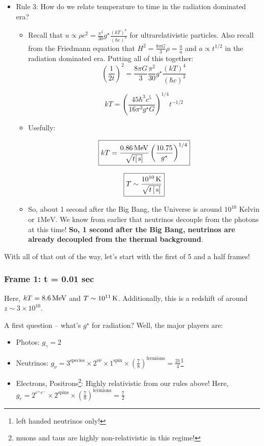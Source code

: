 \documentclass{article}
\newcommand{\unit}[1]{{\,\rm #1}}
\newcommand{\be}{\begin{equation}}
\newcommand{\ee}{\end{equation}}
\begin{document}
\begin{itemize}
    \item Rule 3: How do we relate temperature to time in the radiation dominated era?
    \begin{itemize}
        \item Recall that $u \propto \rho c^2 = \frac{\pi^2}{30}g^\star \frac{(kT)^4}{(\hbar c)^3}$ for ultrarelativistic particles. Also recall from the Friedmann equation that $H^2 = \frac{8\pi G}{3} \rho = \frac{\dot a}{a}$ and $a \propto t^{1/2}$ in the radiation dominated era. Putting all of this together:
        \be
        \left(\frac{1}{2t}\right)^2 = \frac{8\pi G}{3} \frac{\pi^2}{30} g^\star \frac{(kT)^4}{(\hbar c)^3}
        \ee
        
        \be
        \boxed{kT = \left(\frac{45 \hbar^3 c^5}{16 \pi^3 g^\star G}\right)^{1/4} t^{-1/2}}
        \ee
        
        \item Usefully:
        
        \be
        \boxed{kT = \frac{0.86 \unit{MeV}}{\sqrt{t [\unit{s}]}} \left(\frac{10.75}{g^\star}\right)^{1/4}}
        \ee
        
        \be
        \boxed{T \sim \frac{10^{10} \unit{K}}{\sqrt{t \left[\unit{s}\right]}}}
        \ee
        
        \item So, about 1 second after the Big Bang, the Universe is around $10^{10}$ Kelvin or $1 \text{MeV}$. We know from earlier that neutrinos decouple from the photons at this time! \textbf{So, 1 second after the Big Bang, neutrinos are already decoupled from the thermal background}.
    \end{itemize}
    
\end{itemize}

With all of that out of the way, let's start with the first of 5 and a half frames!

\subsubsection{Frame 1: t = 0.01 sec}

Here, $kT = 8.6 \unit{MeV}$ and $T \sim 10^{11} \unit{K}$. Additionally, this is a redshift of around $z \sim 3 \times 10^{10}$.

A first question -- what's $g^\star$ for radiation? Well, the major players are:
\begin{itemize}
    \item Photos: $g_\gamma = 2$
    \item Neutrinos: $g_\nu = 3^\text{species}\times 2^{\nu \bar{\nu}} \times 1^\text{spin}\times \left(\frac{7}{8}\right)^\text{fermions} = \frac{21}{4}$\footnote{left handed neutrinos only!}
    \item Electrons, Positrons\footnote{muons and taus are highly non-relativistic in this regime!}: Highly relativistic from our rules above! Here, $g_e = 2^{e^+e^-}\times 2^\text{spins} \times \left(\frac{7}{8}\right)^\text{fermions} = \frac72$
\end{itemize}
\end{document}
